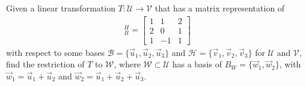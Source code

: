 \begin{exmp}
Given a linear transformation $T: \mathcal{U} \to \mathcal{V}$ that has a matrix representation of
\begin{align*}
[T]_B^H = 
\begin{bmatrix}
1 & 1 & 2 \\
2 & 0 & 1 \\
1 & -1 & 1
\end{bmatrix}
\end{align*}
with respect to some bases $\mathcal{B} = \{\vec{u}_1, \vec{u}_2, \vec{u}_3\}$ and $\mathcal{H} = \{\vec{v}_1, \vec{v}_2, \vec{v}_3\}$ for $\mathcal{U}$ and $\mathcal{V}$, find the restriction of $T$ to $\mathcal{W}$, where $\mathcal{W} \subset \mathcal{U}$ has a basis of $B_W = \{\vec{w}_1, \vec{w}_2\}$, with $\vec{w}_1 = \vec{u}_1+\vec{u}_2$ and $\vec{w}_2 = \vec{u}_1+\vec{u}_2+\vec{u}_3$.
\end{exmp}
